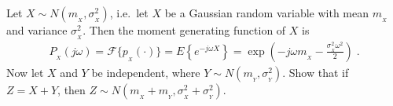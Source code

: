 \item
Let $X \sim N(m_{_X}, \sigma_{_X}^2)$, i.e.\ let $X$ be a Gaussian random variable with mean $m_{_X}$ and variance $\sigma_{_X}^2$. Then the moment generating function of $X$ is
\begin{align*}
    P_{_X}(j\omega) = \mathcal{F} \{ p_{_X}(\cdot) \} = E \left\{ e^{-j\omega X} \right\}
        = \exp \left( - j\omega m_{_X} - \frac{\sigma_{_X}^2 \omega^2}{2} \right) \; .
\end{align*}
Now let $X$ and $Y$ be independent, where $Y \sim N(m_{_Y}, \sigma_{_Y}^2)$. Show that if $Z = X+Y$, then $Z \sim N(m_{_X} + m_{_Y}, \sigma_{_X}^2 + \sigma_{_Y}^2)$.


